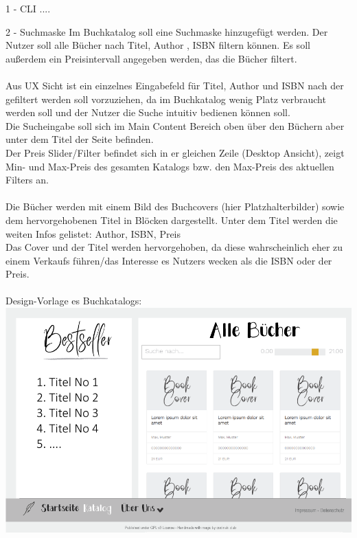 \documentclass[a4paper]{article}
\begin{document}
\begin{exercise}{1 - CLI} 
....
\end{exercise}

\begin{exercise}{2 - Suchmaske} 
Im Buchkatalog soll eine Suchmaske hinzugefügt werden.
Der Nutzer soll alle Bücher nach Titel, Author , ISBN filtern können.
Es soll außerdem ein Preisintervall angegeben werden, das die Bücher filtert.\\\\
Aus UX Sicht ist ein einzelnes Eingabefeld für Titel, Author und ISBN nach der gefiltert werden soll vorzuziehen, da im Buchkatalog wenig Platz verbraucht werden soll und der Nutzer die Suche intuitiv bedienen können soll.\\
Die Sucheingabe soll sich im Main Content Bereich oben über den  Büchern aber unter dem Titel der Seite befinden.\\
Der Preis Slider/Filter befindet sich in er gleichen Zeile (Desktop Ansicht), zeigt Min- und Max-Preis des gesamten Katalogs bzw. den Max-Preis des aktuellen Filters an.\\\\
Die Bücher werden mit einem Bild des Buchcovers (hier Platzhalterbilder) sowie dem hervorgehobenen Titel in Blöcken dargestellt.
Unter dem Titel werden die weiten Infos gelistet: Author, ISBN, Preis\\
Das Cover und der Titel werden hervorgehoben, da diese wahrscheinlich eher zu einem Verkaufs führen/das Interesse es Nutzers wecken als die ISBN oder der Preis.\\\\
Design-Vorlage es Buchkatalogs:\\
\includegraphics[scale=0.5]{../10_bookstore_store_redesign.png}


\end{exercise}
\end{document}

